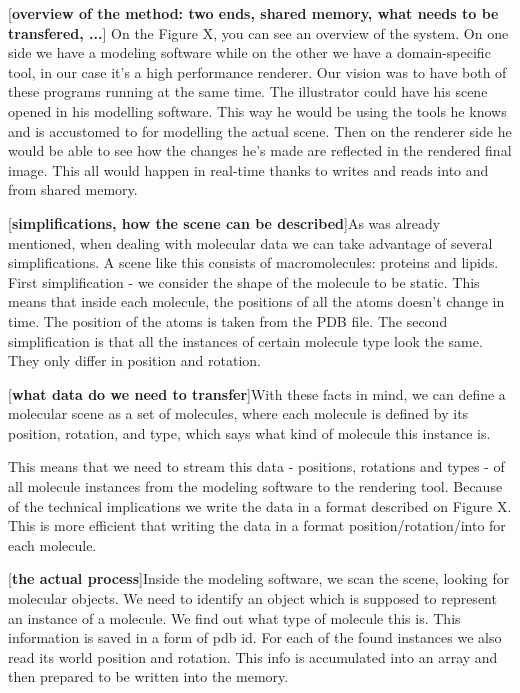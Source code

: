 \documentclass[
  digital, %
  table,   %
  nolof,     %
  nolot,     %
]{fithesis3}
\begin{document}
[\textbf{overview of the method: two ends, shared memory, what needs to be transfered, ...}]
On the Figure X, you can see an overview of the system. On one side we have a modeling software while on the other we have a domain-specific tool, in our case it's a high performance renderer. Our vision was to have both of these programs running at the same time. The illustrator could have his scene opened in his modelling software. This way he would be using the tools he knows and is accustomed to for modelling the actual scene. Then on the renderer side he would be able to see how the changes he's made are reflected in the rendered final image. This all would happen in real-time thanks to writes and reads into and from shared memory.

[\textbf{simplifications, how the scene can be described}]As was already mentioned, when dealing with molecular data we can take advantage of several simplifications. A scene like this consists of macromolecules: proteins and lipids. First simplification - we consider the shape of the molecule to be static. This means that inside each molecule, the positions of all the atoms doesn't change in time. The position of the atoms is taken from the PDB file. The second simplification is that all the instances of certain molecule type look the same. They only differ in position and rotation.

[\textbf{what data do we need to transfer}]With these facts in mind, we can define a molecular scene as a set of molecules, where each molecule is defined by its position, rotation, and type, which says what kind of molecule this instance is.

This means that we need to stream this data - positions, rotations and types - of all molecule instances from the modeling software to the rendering tool. Because of the technical implications we write the data in a format described on Figure X. This is more efficient that writing the data in a format position/rotation/into for each molecule.

[\textbf{the actual process}]Inside the modeling software, we scan the scene, looking for molecular objects. We need to identify an object which is supposed to represent an instance of a molecule. We find out what type of molecule this is. This information is saved in a form of pdb id. For each of the found instances we also read its world position and rotation. This info is accumulated into an array and then prepared to be written into the memory.
\end{document}
